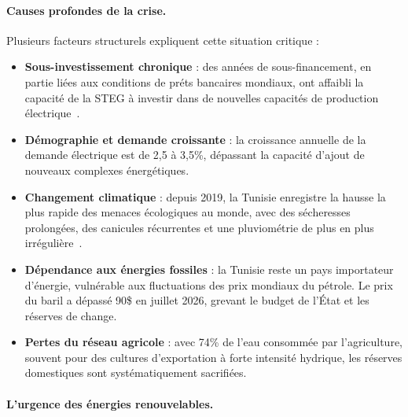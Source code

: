 \documentclass[12pt,a4paper,oneside]{report}
\begin{document}
\paragraph{Causes profondes de la crise.}

Plusieurs facteurs structurels expliquent cette situation critique :

\begin{itemize}[leftmargin=1.2cm]

\item \textbf{Sous-investissement chronique} : des ann\'{e}es de sous-financement, en partie li\'{e}es aux conditions de pr\'{e}ts bancaires mondiaux, ont affaibli la capacit\'{e} de la STEG \`{a} investir dans de nouvelles capacit\'{e}s de production \'{e}lectrique~\cite{steg2024}.

\item \textbf{D\'{e}mographie et demande croissante} : la croissance annuelle de la demande \'{e}lectrique est de 2,5 \`{a} 3,5\%, d\'{e}passant la capacit\'{e} d'ajout de nouveaux complexes \'{e}nerg\'{e}tiques.

\item \textbf{Changement climatique} : depuis 2019, la Tunisie enregistre la hausse la plus rapide des menaces \'{e}cologiques au monde, avec des s\'{e}cheresses prolong\'{e}es, des canicules r\'{e}currentes et une pluviom\'{e}trie de plus en plus irr\'{e}guli\`{e}re~\cite{irena2024}.

\item \textbf{D\'{e}pendance aux \'{e}nergies fossiles} : la Tunisie reste un pays importateur d'\'{e}nergie, vuln\'{e}rable aux fluctuations des prix mondiaux du p\'{e}trole. Le prix du baril a d\'{e}pass\'{e} 90\$ en juillet 2026, grevant le budget de l'\'{E}tat et les r\'{e}serves de change.

\item \textbf{Pertes du r\'{e}seau agricole} : avec 74\% de l'eau consomm\'{e}e par l'agriculture, souvent pour des cultures d'exportation \`{a} forte intensit\'{e} hydrique, les r\'{e}serves domestiques sont syst\'{e}matiquement sacrifi\'{e}es.

\end{itemize}



\paragraph{L'urgence des \'{e}nergies renouvelables.}
\end{document}
